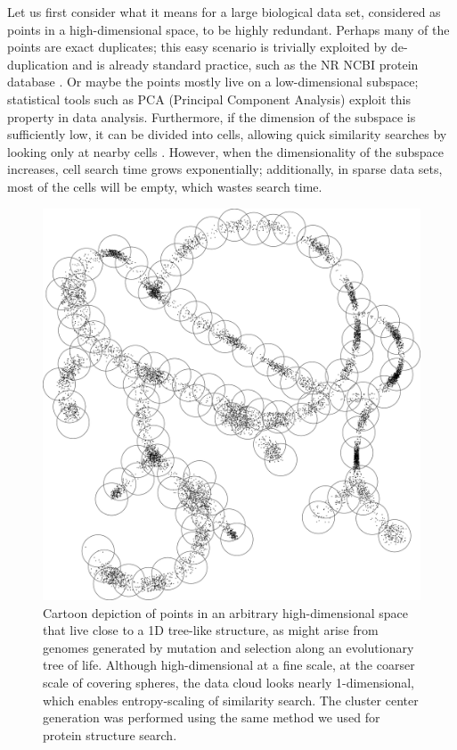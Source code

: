 \documentclass[review,preprint,12pt]{elsarticle}
\renewcommand{\cite}{\citep} %
\theoremstyle{definition}
\theoremstyle{remark}
\numberwithin{equation}{section}
\begin{document}
Let us first consider what it means for a large biological data set, considered as points in a high-dimensional space, to be highly redundant.
Perhaps many of the points are exact duplicates; this easy scenario is trivially exploited by de-duplication and is already standard practice, such as
the NR NCBI protein database \cite{pruitt2005ncbi}.
Or maybe the points mostly live on a low-dimensional subspace; statistical tools such as PCA (Principal Component Analysis) exploit this property in data analysis.
Furthermore, if the dimension of the subspace is sufficiently low,
it can be divided into cells, allowing quick similarity searches by looking only at nearby cells \cite{weber1998quantitative}.
However, when the dimensionality of the subspace increases, cell search time 
grows exponentially; additionally, in sparse data sets, most of the cells will 
be empty, which wastes search time.

\begin{figure}[p]
    \vspace{-5em}
    \centering
    \centerline{\includegraphics[width=8in]{assets/treepoints/treepoints2D_clusters.png}}
    \caption{Cartoon depiction of points in an arbitrary high-dimensional space that live close to a 1D tree-like structure, as might arise from genomes generated by mutation and selection along an evolutionary tree of life. 
Although high-dimensional at a fine scale, at the coarser scale of covering spheres, the data cloud looks nearly 1-dimensional, which enables entropy-scaling of similarity search. The cluster center generation was performed using the same method we used for protein structure search.}
    \label{fig:tree}
\end{figure}
\end{document}
